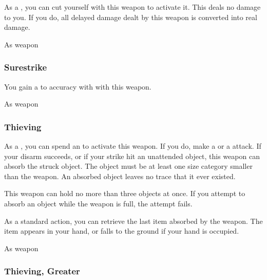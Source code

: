As a , you can cut yourself with this weapon to activate it.
This deals no damage to you.
If you do, all delayed damage dealt by this weapon is converted into real damage.



 As weapon


\lowercase{\hypertarget{item:Surestrike}{}}\label{item:Surestrike}
\hypertarget{item:Surestrike}{\subsubsection{Surestrike\hfill{}}}

You gain a   to accuracy with  with this weapon.



 


 As weapon


\lowercase{\hypertarget{item:Thieving}{}}\label{item:Thieving}
\hypertarget{item:Thieving}{\subsubsection{Thieving\hfill{}}}

As a , you can spend an  to activate this weapon.
If you do, make a  or a  attack.
If your disarm succeeds, or if your strike hit an unattended object, this weapon can absorb the struck object.
The object must be at least one size category smaller than the weapon.
An absorbed object leaves no trace that it ever existed.

This weapon can hold no more than three objects at once.
If you attempt to absorb an object while the weapon is full, the attempt fails.

As a standard action, you can retrieve the last item absorbed by the weapon.
The item appears in your hand, or falls to the ground if your hand is occupied.



 


 As weapon


\lowercase{\hypertarget{item:Thieving, Greater}{}}\label{item:Thieving, Greater}
\hypertarget{item:Thieving, Greater}{\subsubsection{Thieving, Greater\hfill{}}}

